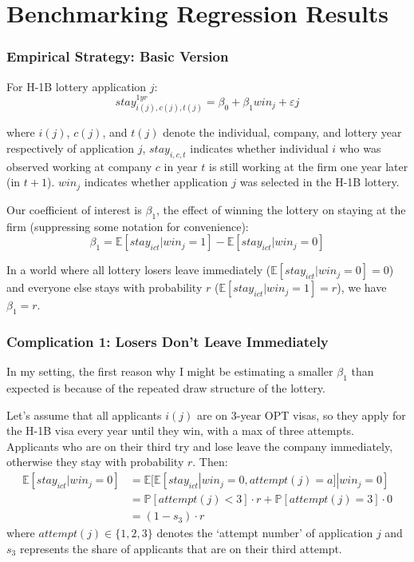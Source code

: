 \documentclass[xcolor=dvipsnames, compress, 12pt, aspectratio=169, handout]{beamer}
\begin{document}
\section{Benchmarking Regression Results}
\begin{frame}
    \frametitle{Empirical Strategy: Basic Version}
For H-1B lottery application $j$:
\begin{equation*}
    stay^{1yr}_{i(j), c(j), t(j)} = \beta_0 + \beta_1 win_{j} + \varepsilon{j}
\end{equation*}

where $i(j)$, $c(j)$, and $t(j)$ denote the individual, company, and lottery year respectively of application $j$, $stay_{i,c,t}$ indicates whether individual $i$ who was observed working at company $c$ in year $t$ is still working at the firm one year later (in $t+1$). $win_{j}$ indicates whether application $j$ was selected in the H-1B lottery.

\vspace{2mm}
Our coefficient of interest is $\beta_1$, the effect of winning the lottery on staying at the firm (suppressing some notation for convenience):
\begin{equation*}
    \beta_1 = \mathbb{E}[stay_{ict}|win_j = 1] - \mathbb{E}[stay_{ict}|win_j = 0]
\end{equation*} 
\vspace{2mm}

In a world where all lottery losers leave immediately ($\mathbb{E}[stay_{ict}|win_j = 0] = 0$) and everyone else stays with probability $r$ ($\mathbb{E}[stay_{ict}|win_j = 1] = r$), we have $\beta_1 = r$. 

\end{frame}

\begin{frame}
\frametitle{Complication 1: Losers Don't Leave Immediately}
In my setting, the first reason why I might be estimating a smaller $\beta_1$ than expected is because of the repeated draw structure of the lottery.
\vspace{2mm}

Let's assume that all applicants $i(j)$ are on 3-year OPT visas, so they apply for the H-1B visa every year until they win, with a max of three attempts. Applicants who are on their third try and lose leave the company immediately, otherwise they stay with probability $r$. Then:
\begin{align*}
    \mathbb{E}[stay_{ict}|win_j = 0] &= \mathbb{E}[\mathbb{E}[stay_{ict}|win_j=0, attempt(j) = a] | win_j = 0] \\
    &= \mathbb{P}[attempt(j) < 3] \cdot r + \mathbb{P}[attempt(j) = 3] \cdot 0 \\
    &= (1-s_3) \cdot r
\end{align*} 
where $attempt(j) \in \{1,2,3\}$ denotes the `attempt number' of application $j$ and $s_3$ represents the share of applicants that are on their third attempt.
\end{frame}
\end{document}
